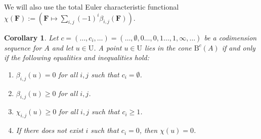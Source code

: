 \documentclass[12pt]{amsart}
\newtheorem{cor}[lemma]{Corollary}
\theoremstyle{definition}
\theoremstyle{remark}
\newcommand{\UU}{\mathrm{U}}
\newcommand{\cc}{c}
\newcommand{\FF}{\mathbf{F}}
\newcommand{\nothing}{\emptyset}
\newcommand{\BBQ}{\mathrm{B}}
\begin{document}
We will 
also use the total Euler characteristic functional $\chi(\FF):=(\FF\mapsto \sum_{i,j}(-1)^i \beta_{i,j}(\FF))$.  

\begin{cor}\label{cor:dualconeA refined}
Let $\cc = (\dots,c_{i},\dots) = (\dots,\nothing,0\dots,0,1\dots,1,\infty, \dots)$ be a codimension sequence for $A$ and let $u\in \UU$.
A point $u\in \UU$ lies in the cone $\BBQ^{\cc}(A)$ if and only if the following equalities and inequalities hold:
\begin{enumerate}
	\item $\beta_{i,j}(u)=0$ for all $i,j$ such that $c_i=\nothing$.
	\item $\beta_{i,j}(u)\geq 0$ for all $i,j$.
	\item  $\chi_{i,j}(u)\geq 0$ for all $i,j$ such that $c_i\geq 1$.
	\item If there does not exist $i$ such that $c_i=0$, then $\chi(u)=0$.
\end{enumerate}
\end{cor}
\end{document}
